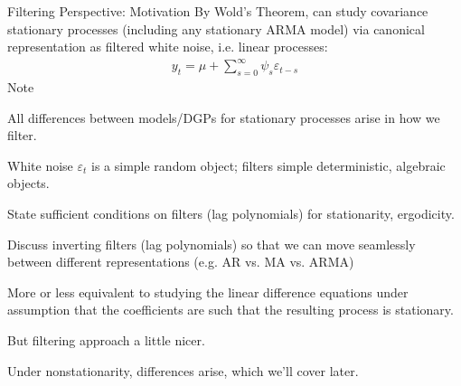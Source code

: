 \documentclass[aspectratio=169, handout]{beamer}
\newcommand{\ra}{\rightarrow}
\begin{document}
{\scriptsize
\begin{frame}{Filtering Perspective: Motivation}
By Wold's Theorem, can study covariance stationary processes (including
any stationary ARMA model) via canonical representation as
\alert{filtered white noise}, i.e. \alert{linear processes}:
\begin{align*}
  y_t = \mu + \sum_{s=0}^\infty \psi_s \varepsilon_{t-s}
\end{align*}
Note
\begin{itemize}
  {\scriptsize
  \item \alert{All} differences between models/DGPs for stationary
    processes arise in how we \alert{filter}.
  \pause
  \item White noise $\varepsilon_t$ is a simple \alert{random}
    object; filters simple \alert{deterministic, algebraic}
    objects.
  \item State sufficient conditions on filters (lag polynomials) for
    \alert{stationarity, ergodicity}.
  \pause
  \item Discuss \alert{inverting} filters (lag polynomials) so that we
    can move seamlessly between different representations (e.g. AR vs.
    MA vs.  ARMA)
  \item More or less equivalent to studying the linear difference
    equations \alert{under assumption} that the coefficients are such
    that the resulting process is \alert{stationary}.

    But filtering approach a little nicer.

  \pause
  \item Under \alert{nonstationarity}, differences arise, which we'll
    cover later.
  }
\end{itemize}
\end{frame}
}




\end{document}
